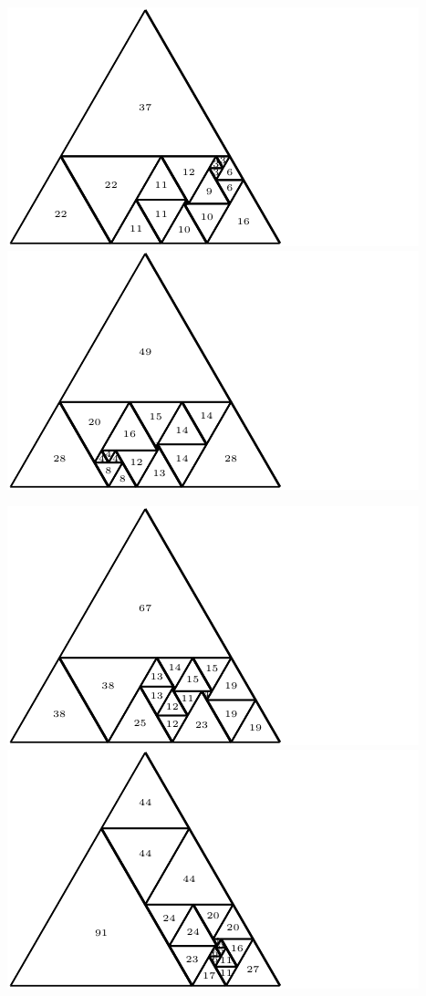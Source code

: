 \documentclass[12pt,amstags,fleqn]{article}
\theoremstyle{plain}
\theoremstyle{definition}
\theoremstyle{definition}
\begin{document}
\begin{center}
\includegraphics{max_relative_size_17.pdf}\includegraphics{max_relative_size_18.pdf}
\end{center}
\begin{center}
\includegraphics{max_relative_size_19.pdf}\includegraphics{max_relative_size_20.pdf}
\end{center}
\end{document}
